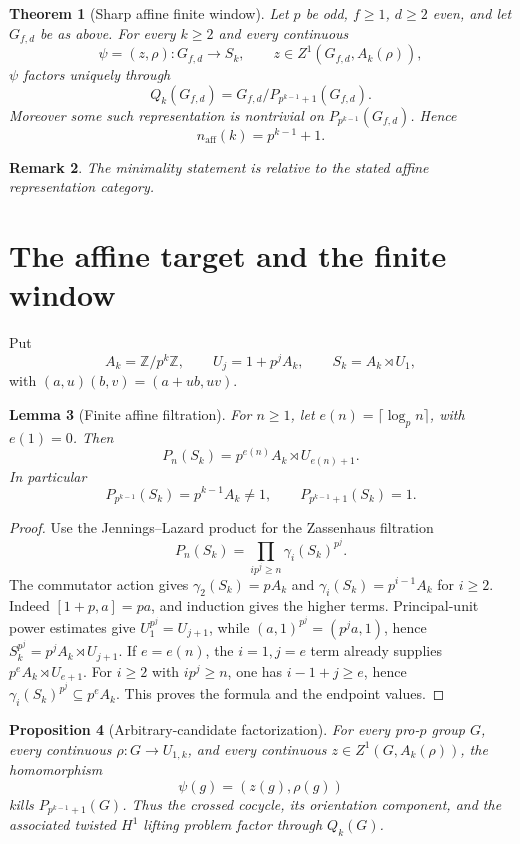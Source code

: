 \documentclass[11pt]{article}
\newtheorem{theorem}{Theorem}[section]
\newtheorem{proposition}[theorem]{Proposition}
\newtheorem{lemma}[theorem]{Lemma}
\newtheorem{remark}[theorem]{Remark}
\begin{document}
\begin{theorem}[Sharp affine finite window]
Let $p$ be odd, $f\ge1$, $d\ge2$ even, and let $G_{f,d}$ be as above. For every $k\ge2$ and every continuous
\[
\psi=(z,\rho):G_{f,d}\longrightarrow S_k,
\qquad z\in Z^1(G_{f,d},A_k(\rho)),
\]
$\psi$ factors uniquely through
\[
Q_k(G_{f,d})=G_{f,d}/P_{p^{k-1}+1}(G_{f,d}).
\]
Moreover some such representation is nontrivial on $P_{p^{k-1}}(G_{f,d})$. Hence
\[
\boxed{n_{\mathrm{aff}}(k)=p^{k-1}+1.}
\]
\end{theorem}

\begin{remark}
The minimality statement is relative to the stated affine representation category.
\end{remark}

\section{The affine target and the finite window}
Put
\[
A_k=\mathbb Z/p^k\mathbb Z, \qquad U_j=1+p^jA_k, \qquad S_k=A_k\rtimes U_1,
\]
with $(a,u)(b,v)=(a+ub,uv)$.

\begin{lemma}[Finite affine filtration]
For $n\ge1$, let $e(n)=\lceil\log_p n\rceil$, with $e(1)=0$. Then
\[
P_n(S_k)=p^{e(n)}A_k\rtimes U_{e(n)+1}.
\]
In particular
\[
P_{p^{k-1}}(S_k)=p^{k-1}A_k\ne1,
\qquad
P_{p^{k-1}+1}(S_k)=1.
\]
\end{lemma}

\begin{proof}
Use the Jennings--Lazard product for the Zassenhaus filtration
\[
P_n(S_k)=\prod_{ip^j\ge n}\gamma_i(S_k)^{p^j}.
\]
The commutator action gives
$\gamma_2(S_k)=pA_k$ and $\gamma_i(S_k)=p^{i-1}A_k$ for $i\ge2$.
Indeed $[1+p,a]=pa$, and induction gives the higher terms.
Principal-unit power estimates give $U_1^{p^j}=U_{j+1}$, while
$(a,1)^{p^j}=(p^ja,1)$, hence
$S_k^{p^j}=p^jA_k\rtimes U_{j+1}$.
If $e=e(n)$, the $i=1,j=e$ term already supplies $p^eA_k\rtimes U_{e+1}$.
For $i\ge2$ with $ip^j\ge n$, one has $i-1+j\ge e$, hence
$\gamma_i(S_k)^{p^j}\subseteq p^eA_k$. This proves the formula and the endpoint values.
\end{proof}

\begin{proposition}[Arbitrary-candidate factorization]
For every pro-$p$ group $G$, every continuous $\rho:G\to U_{1,k}$, and every continuous $z\in Z^1(G,A_k(\rho))$, the homomorphism
\[
\psi(g)=(z(g),\rho(g))
\]
kills $P_{p^{k-1}+1}(G)$. Thus the crossed cocycle, its orientation component, and the associated twisted $H^1$ lifting problem factor through $Q_k(G)$.
\end{proposition}
\end{document}
